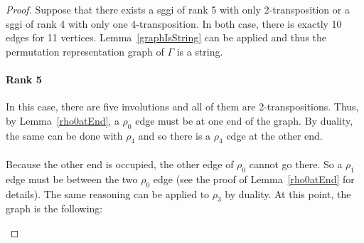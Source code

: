 \begin{proof}
  Suppose that there exists a sggi of rank 5 with only 2-transposition or a sggi of rank 4 with only one 4-transposition. In both case, there is exactly 10 edges for 11 vertices. Lemma~\ref{graphIsString} can be applied and thus the permutation representation graph of $\Gamma$ is a string.

  \paragraph{Rank 5}
  In this case, there are five involutions and all of them are 2-transpositions. Thus, by Lemma~\ref{rho0atEnd}, a $\rho_0$ edge must be at one end of the graph. By duality, the same can be done with $\rho_4$ and so there is a $\rho_4$ edge at the other end.

  \paragraph{}
  Because the other end is occupied, the other edge of $\rho_0$ cannot go there. So a $\rho_1$ edge must be between the two $\rho_0$ edge (see the proof of Lemma~\ref{rho0atEnd} for details). The same reasoning can be applied to $\rho_3$ by duality. At this point, the graph is the following:

  \begin{figure}[H]
    \begin{center}
\end{center}
\end{figure}
\end{proof}

